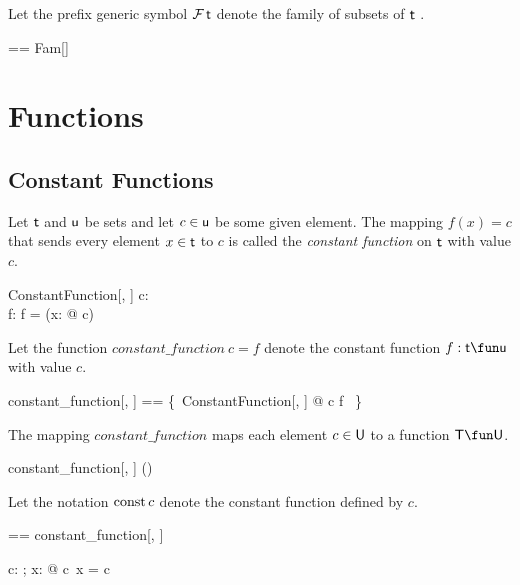 \documentclass{amsart}
\begin{document}
Let the prefix generic symbol $\operatorname{\mathcal{F}} \mathsf{t}$ denote the family of subsets of $\mathsf{t}$ .

\begin{zed}
	\Fam \genT == Fam[\genT]
\end{zed}

\section{Functions}

\subsection{Constant Functions}

Let $\mathsf{t}$ and $\mathsf{u}$ be sets and let $c \in \mathsf{u}$ be some given element.
The mapping $f(x) = c$ that sends every element $x \in \mathsf{t}$ to $c$ is called the \textit{constant function} on $\mathsf{t}$ with value $c$.

\begin{schema}{ConstantFunction}[\genT, \genU]
	c: \genU \\
	f: \genT \fun \genU
\where
	f = (\lambda x: \genT @ c)
\end{schema}

Let the function $constant\_function~c = f$ denote the constant function $f: \genT \fun \genU$ with value $c$.

\begin{zed}
	constant\_function[\genT, \genU] == \{~ConstantFunction[\genT, \genU] @ c \mapsto f ~\}
\end{zed}

\begin{remark}
The mapping $constant\_function$ maps each element $c \in \mathsf{U}$ to a function $\setT \fun \setU$.
\begin{zed}
	constant\_function[\setT, \setU] \in \setU \fun (\setT \fun \setU)
\end{zed}
\end{remark}

Let the notation $\operatorname{const} c$ denote the constant function defined by $c$.

\begin{zed}
	\const[\genT, \genU] == constant\_function[\genT, \genU]
\end{zed}

\begin{remark}
\begin{zed}
	\forall c: \setU; x: \setT @ \const[\setT, \setU] c~x = c
\end{zed}
\end{remark}
\end{document}
